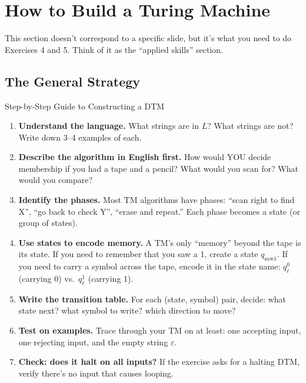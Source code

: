 \documentclass[11pt,a4paper]{article}
\begin{document}
\newpage
\section{How to Build a Turing Machine}

This section doesn't correspond to a specific slide, but it's what you need to do Exercises 4 and 5. Think of it as the ``applied skills'' section.

\subsection{The General Strategy}

\begin{notebox}{Step-by-Step Guide to Constructing a DTM}
\begin{enumerate}
\item \textbf{Understand the language.} What strings are in $L$? What strings are not? Write down 3--4 examples of each.

\item \textbf{Describe the algorithm in English first.} How would YOU decide membership if you had a tape and a pencil? What would you scan for? What would you compare?

\item \textbf{Identify the phases.} Most TM algorithms have phases: ``scan right to find X'', ``go back to check Y'', ``erase and repeat.'' Each phase becomes a state (or group of states).

\item \textbf{Use states to encode memory.} A TM's only ``memory'' beyond the tape is its state. If you need to remember that you saw a 1, create a state $q_{\text{saw1}}$. If you need to carry a symbol across the tape, encode it in the state name: $q_\ell^0$ (carrying 0) vs.\ $q_\ell^1$ (carrying 1).

\item \textbf{Write the transition table.} For each (state, symbol) pair, decide: what state next? what symbol to write? which direction to move?

\item \textbf{Test on examples.} Trace through your TM on at least: one accepting input, one rejecting input, and the empty string $\varepsilon$.

\item \textbf{Check: does it halt on all inputs?} If the exercise asks for a halting DTM, verify there's no input that causes looping.
\end{enumerate}
\end{notebox}
\end{document}
